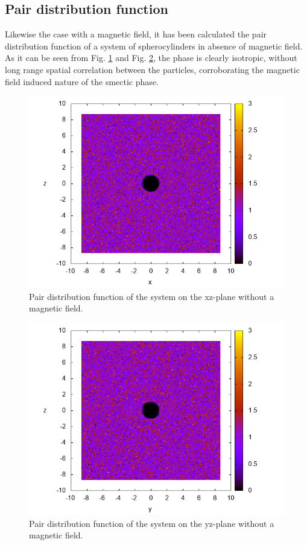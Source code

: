 \documentclass{article}
\begin{document}
\subsection{Pair distribution function}

Likewise the case with a magnetic field, it has been calculated the pair distribution function of a system of spherocylinders in absence of magnetic field. As it can be seen from Fig. \ref{fig:gxz_noB} and Fig. \ref{fig:gyz_noB}, the phase is clearly isotropic, without long range spatial correlation between the particles, corroborating the magnetic field induced nature of the smectic phase.


\begin{figure}
    \centering
    \includegraphics[width=1\columnwidth]{gxz_noB.png}
    \caption{Pair distribution function of the system on the xz-plane without a magnetic field.}
    \label{fig:gxz_noB}
\end{figure}


\begin{figure}
    \centering
    \includegraphics[width=1\columnwidth]{gyz_noB.png}
    \caption{Pair distribution function of the system on the yz-plane without a magnetic field.}
    \label{fig:gyz_noB}
\end{figure}
\end{document}
